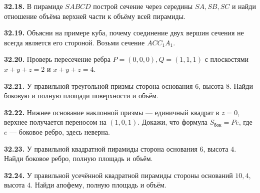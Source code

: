 \noindent\begin{minipage}[t]{\linewidth}\textbf{32.18.}\starmark{} В пирамиде \(SABCD\) построй сечение через середины \(SA,SB,SC\) и найди отношение объёма верхней части к объёму всей пирамиды.\par\end{minipage}\par
\noindent\begin{minipage}[t]{\linewidth}\textbf{32.19.}\starmark{} Объясни на примере куба, почему соединение двух вершин сечения не всегда является его стороной. Возьми сечение \(ACC_1A_1\).\par\end{minipage}\par
\noindent\begin{minipage}[t]{\linewidth}\textbf{32.20.} Проверь пересечение ребра \(P=(0,0,0),Q=(1,1,1)\) с плоскостями \(x+y+z=2\) и \(x+y+z=4\).\par\end{minipage}\par
\noindent\begin{minipage}[t]{\linewidth}\textbf{32.21.} У правильной треугольной призмы сторона основания \(6\), высота \(8\). Найди боковую и полную площади поверхности и объём.\par\end{minipage}\par
\noindent\begin{minipage}[t]{\linewidth}\textbf{32.22.}\starmark{} Нижнее основание наклонной призмы — единичный квадрат в \(z=0\), верхнее получается переносом на \((1,0,1)\). Докажи, что формула \(S_{\mathrm{бок}}=P e\), где \(e\) — боковое ребро, здесь неверна.\par\end{minipage}\par
\noindent\begin{minipage}[t]{\linewidth}\textbf{32.23.} У правильной квадратной пирамиды сторона основания \(6\), высота \(4\). Найди боковое ребро, полную площадь и объём.\par\end{minipage}\par
\noindent\begin{minipage}[t]{\linewidth}\textbf{32.24.} У правильной усечённой квадратной пирамиды стороны оснований \(10,4\), высота \(4\). Найди апофему, полную площадь и объём.\par\end{minipage}\par
